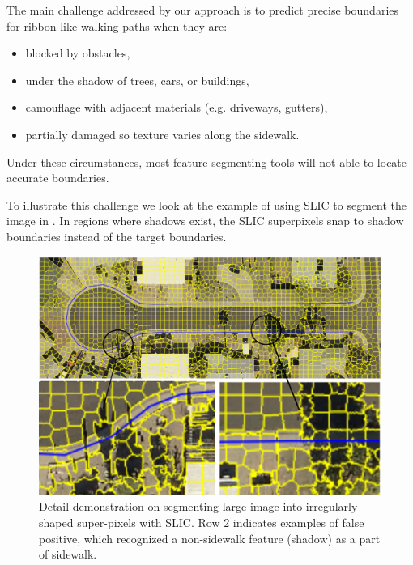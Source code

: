The main challenge addressed by our approach is to predict precise boundaries for ribbon-like walking paths when they are:
\begin{itemize}
    \item blocked by obstacles,
    \item under the shadow of trees, cars, or buildings,
    \item camouflage with adjacent materials (e.g. driveways, gutters),
    \item partially damaged so texture varies along the sidewalk.
\end{itemize}
Under these circumstances, most feature segmenting tools will not able to locate accurate boundaries. 

To illustrate this challenge we look at the example of using \ac{SLIC} to segment the image in . In regions where shadows exist, the \ac{SLIC} superpixels snap to shadow boundaries instead of the target boundaries. 
\begin{figure}
    \centering
    \includegraphics[width=0.95\columnwidth]{Figures/slic_sample1.pdf}
    \caption[Example of Simple Linear Iterative Clustering]{Detail demonstration on segmenting large image into irregularly shaped super-pixels with \ac{SLIC}. Row 2 indicates examples of false positive, which recognized a non-sidewalk feature (shadow) as a part of sidewalk.}
    \label{fig:slic}
\end{figure}


